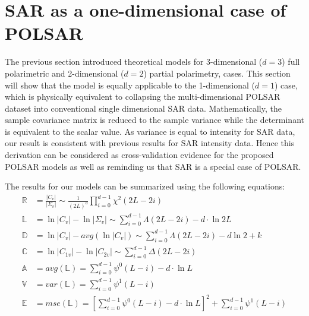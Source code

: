 \documentclass[journal,12pt,draftcls,onecolumn]{IEEEtran}
\begin{document}
\section{SAR as a one-dimensional case of POLSAR}
\label{sec:sar_special_case_of_polsar}

The previous section  introduced  theoretical models for 3-dimensional ($d=3$) full polarimetric and 2-dimensional ($d=2$) partial polarimetry, cases.
This section will show that the model is equally  applicable to the 1-dimensional ($d=1$) case,
  which is physically equivalent to  collapsing the multi-dimensional POLSAR dataset  into conventional single dimensional SAR data.
Mathematically, the sample covariance matrix is reduced to the sample variance while the determinant is equivalent to  the scalar value.
As variance is equal to intensity for SAR data, our result is consistent with previous results for SAR intensity data.
Hence this derivation can be considered as cross-validation evidence for the proposed POLSAR models
  as well as reminding us that SAR is a special case of POLSAR.
  
The results for our models can be summarized using the following equations:
\begin{align}
  \mathbb{R} &= \frac{|C_v|}{|\Sigma_v|} \sim \frac{1}{(2L)^d} \prod^{d-1}_{i=0} \chi^2(2L-2i) \\%
  \mathbb{L} &= \ln{|C_v|} - \ln{|\Sigma_v|} \sim \sum^{d-1}_{i=0} \Lambda(2L-2i) - d \cdot \ln{2L} \\ %
  \mathbb{D} &= \ln{|C_v|} - avg(\ln{|C_v|}) \sim \sum^{d-1}_{i=0} \Lambda(2L-2i) - d \ln{2} + k\\
  \mathbb{C} &= \ln{|C_{1v}|} - \ln{|C_{2v}|} \sim \sum^{d-1}_{i=0} \Delta(2L-2i) \\
  \mathbb{A} &= avg(\mathbb{L}) = \sum^{d-1}_{i=0} \psi^0(L-i) - d \cdot \ln{L} \\ %
  \mathbb{V} &= var(\mathbb{L}) = \sum^{d-1}_{i=0} \psi^1(L-i) \\ %
  \mathbb{E} &= mse(\mathbb{L}) =\left[ \sum^{d-1}_{i=0} \psi^0(L-i) - d \cdot \ln{L} \right]^2 +  \sum^{d-1}_{i=0} \psi^1(L-i) \label{eqn:polsar_dispersion_mse} 
\end{align}
\end{document}

